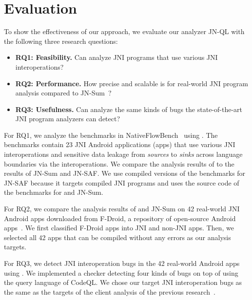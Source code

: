 \newcommand{\req}[1]{RQ#1}


\section{Evaluation}\label{sec:eval}

To show the effectiveness of our approach, we evaluate our analyzer
JN-QL with the following three research questions:
\begin{itemize}
  \item \textbf{\req{1}: Feasibility.} Can \ours analyze JNI programs that use
    various JNI interoperations?

  \item \textbf{\req{2}: Performance.} How precise and scalable is \ours for
    real-world JNI program analysis compared to JN-Sum~\cite{LeeASE20}?

  \item \textbf{\req{3}: Usefulness.} Can \ours analyze the same kinds of bugs
    the state-of-the-art JNI program analyzers can detect?
\end{itemize}

For \req{1}, we analyze the benchmarks in NativeFlowBench~\cite{nativeflowbench,
JN-SAF} using \ours. The benchmarks contain 23 JNI Android applications (apps) that
use various JNI interoperations and sensitive data leakage from {\it sources} to
{\it sinks} across language boundaries via the interoperations. We compare
the analysis results of \ours to the results of JN-Sum and JN-SAF. We use
compiled versions of the benchmarks for JN-SAF because it targets compiled JNI
programs and uses the source code of the benchmarks for \ours and JN-Sum.

For \req{2}, we compare the analysis results of \ours and JN-Sum on 42
real-world JNI Android apps downloaded from F-Droid, a repository of
open-source Android apps~\cite{fdroid}. We first classified
F-Droid apps into JNI and non-JNI apps. Then, we selected
all 42 apps that can be compiled without any errors as our analysis targets.

For \req{3}, we detect JNI interoperation bugs in the 42 real-world Android
apps using \ours. We implemented a checker detecting four kinds of
bugs on top of \ours using the query language of CodeQL. We chose our target
JNI interoperation bugs as the same as the targets of the client
analysis of the previous research~\cite{LeeASE20, ILEA}.


